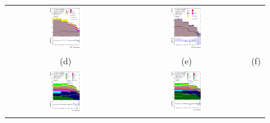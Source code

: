 \begin{figure}[H]
\begin{tabular}{@{}ccc@{}}
\includegraphics[width=0.29\textwidth]{figures/tcH_reg1l1tau1b3j_os.pdf}&
\includegraphics[width=0.29\textwidth]{figures/tcH_reg1l2tau1bnj_ss.pdf}\\
(d) & (e)  & (f) \\
\includegraphics[width=0.29\textwidth]{figures/tcH_reg2mtau1b2jos.pdf}&
\includegraphics[width=0.29\textwidth]{figures/tcH_reg2mtau1b3jos.pdf}&

\end{tabular}
\end{figure}

